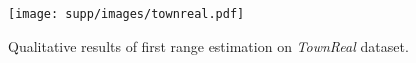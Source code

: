 \begin{figure}[t]
\centering
\texttt{[image: supp/images/townreal.pdf]}

\caption{Qualitative results of first range estimation on \textit{TownReal} dataset.}
\label{fig:iccv_supp_townreal}

\end{figure}